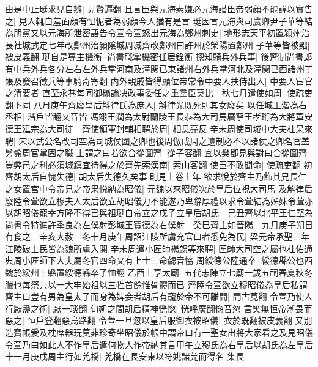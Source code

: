 由是中止珽求見自辨|{
	見賢遍翻}
且言臣與元海素嫌必元海譛臣帝弱顔不能諱以實告之|{
	見人輒自羞面顔有忸怩者為弱顔今人猶有是言}
珽因言元海與司農卿尹子華等結為朋黨又以元海所泄密語告令萱令萱怒出元海為鄭州刺史|{
	地形志天平初置潁州治長社城武定七年改鄭州治潁隂城周㓕齊改鄭州曰許州於榮陽置鄭州}
子華等皆被黜|{
	被皮義翻}
珽自是專主機衡|{
	尚書職掌機密任居銓衡}
摠知騎兵外兵事|{
	後齊制尚書郎有中兵外兵各分左右左外兵掌河南及潼関已東諸州右外兵掌河北及潼関已西諸州丁帳及發召徵兵等事騎奇寄翻}
内外親戚皆得顯位帝常令中要人扶侍出入|{
	中要人宦官之清要者}
直至永巷每同御榻論决政事委任之重羣臣莫比　秋七月遣使如周|{
	使疏吏翻下同}
八月庚午齊廢皇后斛律氏為庶人|{
	斛律光既死則其女廢矣}
以任城王湝為右丞相|{
	湝戶皆翻又音皆}
馮翊王潤為太尉蘭陵王長恭為大司馬廣寧王孝珩為大將軍安德王延宗為大司徒　齊使領軍封輔相聘於周|{
	相息亮反}
辛未周使司城中大夫杜杲來聘|{
	宋以武公名改司空為司城侯國之卿也後周倣成周之遺制必不以諸侯之卿名官盖髣髴周官掌固之職}
上謂之曰若欲合從圖齊|{
	從子容翻}
宜以樊鄧見與對曰合從圖齊豈弊邑之利必須城鎮宜待得之於齊先索漢南|{
	索山客翻}
使臣不敢聞命|{
	使疏吏翻}
初齊胡太后自愧失德|{
	胡太后失德久矣事則見上卷上年}
欲求悅於齊主乃飾其兄長仁之女置宫中令帝見之帝果悦納為昭儀|{
	元魏以來昭儀次於皇后位視大司馬}
及斛律后廢陸令萱欲立穆夫人太后欲立胡昭儀力不能遂乃卑辭厚禮以求令萱結為姊妹令萱亦以胡昭儀寵幸方隆不得已與祖珽白帝立之戊子立皇后胡氏　己丑齊以北平王仁堅為尚書令特進許季良為左僕射彭城王寶德為右僕射　癸巳齊主如晉陽　九月庚子朔日有食之　辛亥大赦　冬十月庚午周詔江陵所虜充官口者悉免為民|{
	梁元帝承聖三年江陵破士民皆為魏所虜入関}
辛未周遣小匠師楊勰等來聘|{
	匠師大司空之屬也杜佑通典周小匠師下大夫屬冬官四命又有上士三命勰音恊}
周綏德公陸通卒|{
	綏德縣公也西魏於綏州上縣置綏德縣卒子恤翻}
乙酉上享太廟|{
	五代志陳立七廟一歲五祠春夏秋冬臘也每祭共以一大牢始祖以三牲首餘惟骨體而已}
齊陸令萱欲立穆昭儀為皇后私謂齊主曰豈有男為皇太子而身為婢妾者胡后有寵於帝不可離間|{
	間古莧翻}
令萱乃使人行厭蠱之術|{
	厭一琰翻}
旬朔之間胡后精神恍惚|{
	恍呼廣翻惚音忽}
言笑無恒帝漸畏而惡之|{
	恒戶登翻惡烏路翻}
令萱一旦忽以皇后服御衣被昭儀|{
	衣於既翻被皮義翻}
又别造寶帳爰及枕席器玩莫非珍奇坐昭儀於帳中謂帝曰有一聖女出將大家看之及見昭儀令萱乃曰如此人不作皇后遣何物人作帝納其言甲午立穆氏為右皇后以胡氏為左皇后十一月庚戌周主行如羌橋|{
	羌橋在長安東以符姚諸羌而得名}
集長

